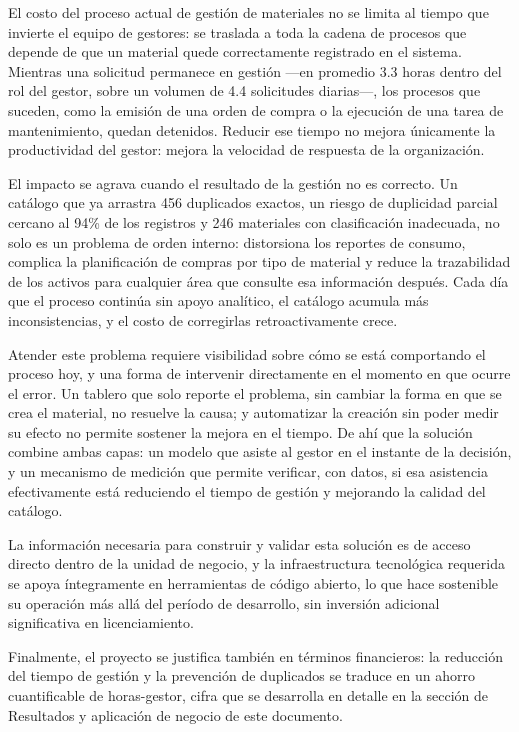 El costo del proceso actual de gestión de materiales no se limita al tiempo que invierte el equipo de gestores: se traslada a toda la cadena de procesos que depende de que un material quede correctamente registrado en el sistema. Mientras una solicitud permanece en gestión —en promedio 3.3 horas dentro del rol del gestor, sobre un volumen de 4.4 solicitudes diarias—, los procesos que suceden, como la emisión de una orden de compra o la ejecución de una tarea de mantenimiento, quedan detenidos. Reducir ese tiempo no mejora únicamente la productividad del gestor: mejora la velocidad de respuesta de la organización.

El impacto se agrava cuando el resultado de la gestión no es correcto. Un catálogo que ya arrastra 456 duplicados exactos, un riesgo de duplicidad parcial cercano al 94\% de los registros y 246 materiales con clasificación inadecuada, no solo es un problema de orden interno: distorsiona los reportes de consumo, complica la planificación de compras por tipo de material y reduce la trazabilidad de los activos para cualquier área que consulte esa información después. Cada día que el proceso continúa sin apoyo analítico, el catálogo acumula más inconsistencias, y el costo de corregirlas retroactivamente crece.

Atender este problema requiere visibilidad sobre cómo se está comportando el proceso hoy, y una forma de intervenir directamente en el momento en que ocurre el error. Un tablero que solo reporte el problema, sin cambiar la forma en que se crea el material, no resuelve la causa; y automatizar la creación sin poder medir su efecto no permite sostener la mejora en el tiempo. De ahí que la solución combine ambas capas: un modelo que asiste al gestor en el instante de la decisión, y un mecanismo de medición que permite verificar, con datos, si esa asistencia efectivamente está reduciendo el tiempo de gestión y mejorando la calidad del catálogo.

La información necesaria para construir y validar esta solución es de acceso directo dentro de la unidad de negocio, y la infraestructura tecnológica requerida se apoya íntegramente en herramientas de código abierto, lo que hace sostenible su operación más allá del período de desarrollo, sin inversión adicional significativa en licenciamiento.

Finalmente, el proyecto se justifica también en términos financieros: la reducción del tiempo de gestión y la prevención de duplicados se traduce en un ahorro cuantificable de horas-gestor, cifra que se desarrolla en detalle en la sección de Resultados y aplicación de negocio de este documento.